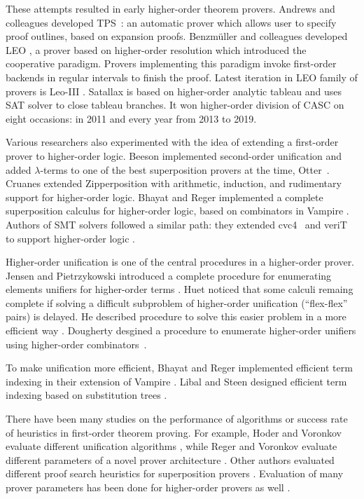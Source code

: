 These attempts resulted in early higher-order theorem provers. Andrews and
colleagues developed TPS~\cite{abinpx-96-tps}: an automatic prover which
allows user to specify proof outlines, based on expansion proofs. Benzm\"uller
and colleagues developed LEO \cite{cbmk-98-leo}, a prover based on higher-order
resolution which introduced the cooperative paradigm. Provers implementing this paradigm
invoke first-order backends in regular intervals to finish the proof. Latest
iteration in LEO family of provers is Leo-III \cite{sb-21-leo3}. Satallax
\cite{cb-12-satallax} is based on higher-order analytic tableau and uses SAT solver
to close tableau branches. It won higher-order division of CASC on eight occasions:
in 2011 and every year from 2013 to 2019.

Various researchers also experimented with the idea of extending a first-order
prover to higher-order logic. Beeson \cite{mb-04-lam-logic} implemented second-order
unification and added $\lambda$-terms to one of the best superposition
provers at the time, Otter~\cite{mcc-03-otter}. Cruanes extended Zipperposition
\cite{sc-15-simon-phd} with arithmetic, induction, and rudimentary support for
higher-order logic. Bhayat and Reger implemented a complete superposition
calculus  for higher-order logic, based on combinators  in Vampire
\cite{br-20-full-sup-w-combs}. Authors of SMT solvers followed a similar path:
they extended cvc4~\cite{cbetal-11-cvc4} and veriT~\cite{bodf-09-veriT} to
support higher-order logic \cite{brotb-19-ho-smt}.

Higher-order unification is one of the central procedures in a higher-order
prover. Jensen and Pietrzykowski introduced a complete procedure for enumerating
elements unifiers for higher-order terms \cite{jp-76-unif}. Huet noticed that
some calculi remaing complete if solving a difficult subproblem of higher-order
unification (``flex-flex'' pairs) is delayed. He described procedure to solve
this easier problem in a more efficient way \cite{gh-75-unification}. Dougherty
desgined a procedure to enumerate higher-order unifiers using higher-order
combinators~\cite{dd-93-comb-unif}. 

To make unification more efficient, Bhayat
and Reger implemented efficient term indexing in their extension of Vampire
\cite{br-20-full-sup-w-combs}. Libal and Steen designed efficient term indexing
based on substitution trees \cite{ls-16-indexing}.

There have been many studies on the performance of algorithms or success rate of
heuristics in first-order theorem proving. For example, Hoder and Voronkov
evaluate different unification algorithms \cite{hv-09-unifalgs}, while Reger and
Voronkov evaluate different parameters of a novel prover architecture
\cite{rsv-15-playing-with-avatar}. Other authors evaluated different proof
search heuristics for superposition provers \cite{gs-20-clausesel,
hrsv-16-selsel, sm-16-clausesel}. Evaluation of many prover parameters has been
done for higher-order provers as well
\cite{benzmueller-et-al-05-can-ho-fo-coop,fb-2016-internal-guidance-satallax,sb-15-beta,wskb-16-effective-norm}.
